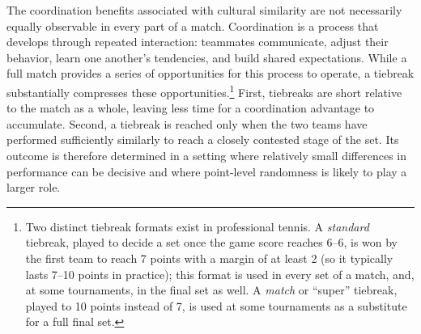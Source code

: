 \documentclass[10pt]{article}
\begin{document}
The coordination benefits associated with cultural similarity are not necessarily  equally observable in every part of a match. Coordination is a process that develops through repeated interaction: teammates communicate, adjust their behavior, learn one another's tendencies, and build shared expectations. While a full match provides a series of opportunities for this process to operate, a tiebreak substantially
compresses these opportunities.\footnote{Two distinct tiebreak formats exist in professional tennis. A \emph{standard} tiebreak, played to decide a set once the game score reaches 6--6, is won by the first team to reach 7 points with a margin of at least 2 (so it typically lasts 7--10 points in practice); this format is used in every set of a match, and, at some tournaments, in the final set as well. A \emph{match} or ``super'' tiebreak, played to 10 points instead of 7, is used at some tournaments as a substitute for a full final set. } First, tiebreaks are short relative to the match as a whole, leaving less time for a coordination advantage to accumulate. Second, a tiebreak is reached only when the two teams have performed sufficiently similarly to reach a closely contested stage of the set. Its outcome is therefore determined in a setting where relatively small differences in performance can be decisive and where point-level randomness is likely to play a larger role.

\end{document}
